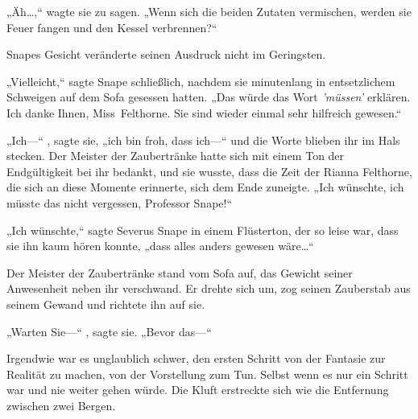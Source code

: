 „Äh…,“ wagte sie zu sagen. „Wenn sich die beiden Zutaten vermischen, werden sie Feuer fangen und den Kessel verbrennen?“

Snapes Gesicht veränderte seinen Ausdruck nicht im Geringsten.

„Vielleicht,“ sagte Snape schließlich, nachdem sie minutenlang in entsetzlichem Schweigen auf dem Sofa gesessen hatten. „Das würde das Wort \emph{'müssen'} erklären. Ich danke Ihnen, Miss~Felthorne. Sie sind wieder einmal sehr hilfreich gewesen.“

„Ich—“ , sagte sie, „ich bin froh, dass ich—“ und die Worte blieben ihr im Hals stecken. Der Meister der Zaubertränke hatte sich mit einem Ton der Endgültigkeit bei ihr bedankt, und sie wusste, dass die Zeit der Rianna Felthorne, die sich an diese Momente erinnerte, sich dem Ende zuneigte. „Ich wünschte, ich müsste das nicht vergessen, Professor Snape!“

„Ich wünschte,“ sagte Severus Snape in einem Flüsterton, der so leise war, dass sie ihn kaum hören konnte, „dass alles anders gewesen wäre…“

Der Meister der Zaubertränke stand vom Sofa auf, das Gewicht seiner Anwesenheit neben ihr verschwand. Er drehte sich um, zog seinen Zauberstab aus seinem Gewand und richtete ihn auf sie.

„Warten Sie—“ , sagte sie. „Bevor das—“

Irgendwie war es unglaublich schwer, den ersten Schritt von der Fantasie zur Realität zu machen, von der Vorstellung zum Tun. Selbst wenn es nur ein Schritt war und nie weiter gehen würde. Die Kluft erstreckte sich wie die Entfernung zwischen zwei Bergen.

